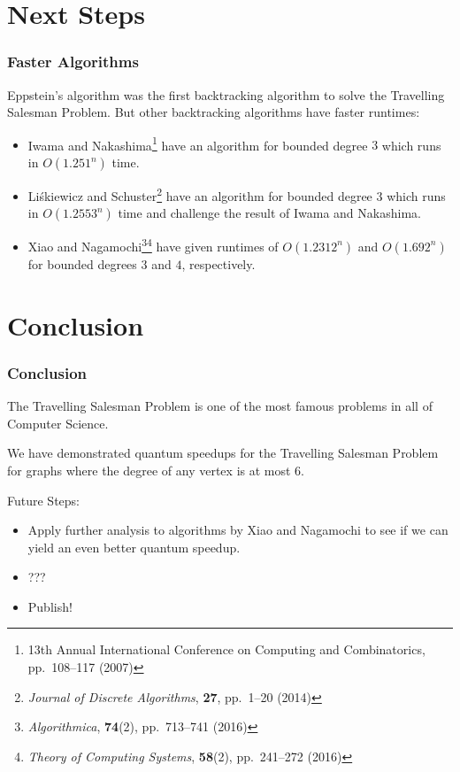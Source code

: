 \documentclass[]{beamer}
\begin{document}
\section{Next Steps}

\begin{frame}
\frametitle{Faster Algorithms}
Eppstein's algorithm was the first backtracking algorithm to solve the Travelling Salesman Problem. But other backtracking algorithms have faster runtimes:

\begin{itemize}
\item Iwama and Nakashima\footnote{13th Annual International Conference on Computing and Combinatorics, pp.\ 108--117 (2007)} have an algorithm for bounded degree $3$ which runs in $O(1.251^n)$ time.
\item Li\'{s}kiewicz and Schuster\footnote{{\em Journal of Discrete Algorithms}, {\bf 27}, pp.\ 1--20 (2014)} have an algorithm for bounded degree $3$ which runs in $O(1.2553^n)$ time and challenge the result of Iwama and Nakashima.
\item Xiao and Nagamochi\footnote{{\em Algorithmica}, {\bf 74}(2), pp.\ 713--741 (2016)}\footnote{{\em Theory of Computing Systems}, {\bf 58}(2), pp.\ 241--272 (2016)} have given runtimes of $O(1.2312^n)$ and $O(1.692^n)$ for bounded degrees $3$ and $4$, respectively.
\end{itemize}
\end{frame}

\section{Conclusion}

\begin{frame}
\frametitle{Conclusion}
The Travelling Salesman Problem is one of the most famous problems in all of Computer Science.

We have demonstrated quantum speedups for the Travelling Salesman Problem for graphs where the degree of any vertex is at most $6$.

Future Steps:
\begin{itemize}
\item Apply further analysis to algorithms by Xiao and Nagamochi to see if we can yield an even better quantum speedup.
\item ???
\item Publish!
\end{itemize}
\end{frame}
\end{document}
